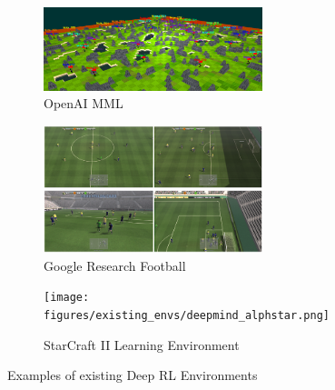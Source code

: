 \begin{figure}[h!]
	\begin{subfigure}[b]{0.3\textwidth}
		\centering
		\includegraphics[width=0.7\textwidth]{figures/existing_envs/openai_mmo.png}
		\caption{OpenAI MML}
		\label{fig:openai_mmo}
	\end{subfigure}
	\hfill
	\begin{subfigure}[b]{0.3\textwidth}
		\centering
		\includegraphics[width=0.7\textwidth]{figures/existing_envs/google_football.png}
		\caption{Google Research Football}
		\label{fig:google_football}
	\end{subfigure}
	\hfill
	\begin{subfigure}[b]{0.3\textwidth}
		\centering
		\texttt{[image: figures/existing\_envs/deepmind\_alphstar.png]}
		\caption{StarCraft II Learning Environment}
		\label{fig:deepmind_alphstar}
	\end{subfigure}
	\hfill
	   \caption{Examples of existing Deep RL Environments}
	   \label{fig:envs_examples}
\end{figure}